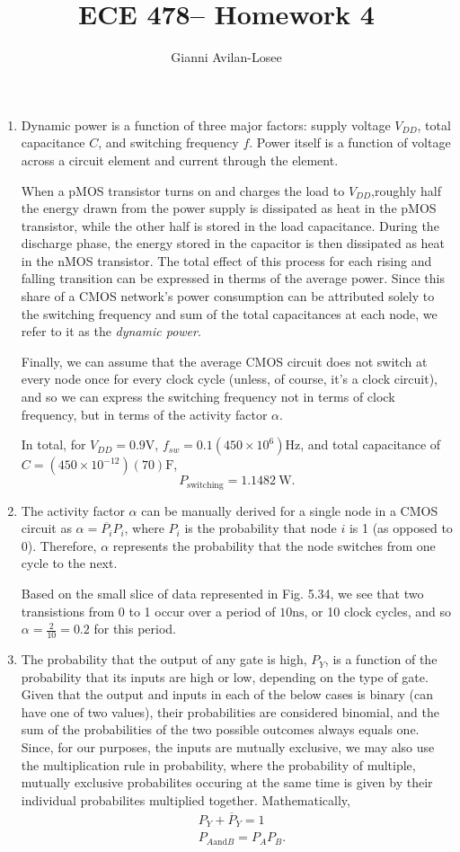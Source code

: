 \documentclass{article}
\title{ECE 478-- Homework 4}
\author{Gianni Avilan-Losee}
\begin{document}
\setcounter{section}{5}
\setcounter{subsection}{1}
\begin{enumerate}[label=\thesubsection]
	\item Dynamic power is a function of three major factors: supply voltage \(V_{DD}\), total capacitance \(C\), and switching frequency \(f\). Power itself is a function of voltage across a circuit element and current through the element.

		When a pMOS transistor turns on and charges the load to \(V_{DD}\),roughly half the energy drawn from the power supply is dissipated as heat in the pMOS transistor, while the other half is stored in the load capacitance. During the discharge phase, the energy stored in the capacitor is then dissipated as heat in the nMOS transistor. The total effect of this process for each rising and falling transition can be expressed in therms of the average power. Since this share of a CMOS network's power consumption can be attributed solely to the switching frequency and sum of the total capacitances at each node, we refer to it as the \textit{dynamic power}. 

		Finally, we can assume that the average CMOS circuit does not switch at every node once for every clock cycle (unless, of course, it's a clock circuit), and so we can express the switching frequency not in terms of clock frequency, but in terms of the activity factor \(\alpha\). 

		In total, for \(V_{DD} = 0.9 \mathrm{V}\), \(f_{sw}=0.1(450 \times 10^6) \mathrm{Hz}\), and total capacitance of \(C=(450 \times 10^{-12})(70)\mathrm{F}\),
		\[
			P_{\mathrm{switching}} = 1.1482 \ \mathrm{W}.
		\]
		\setcounter{subsection}{4}
	\item The activity factor \(\alpha\) can be manually derived for a single node in a CMOS circuit as \(\alpha = \overline{P_i}P_i\), where \(P_i\) is the probability that node \(i\) is 1 (as opposed to 0). Therefore, \(\alpha\) represents the probability that the node switches from one cycle to the next.

		Based on the small slice of data represented in Fig. 5.34, we see that two transistions from 0 to 1 occur over a period of \(10 \mathrm{ns}\), or 10 clock cycles, and so \(\alpha = \frac{2}{10} = 0.2\) for this period.
		\setcounter{subsection}{7}
	\item The probability that the output of any gate is high, \(P_Y\), is a function of the probability that its inputs are high or low, depending on the type of gate. Given that the output and inputs in each of the below cases is binary (can have one of two values), their probabilities are considered binomial, and the sum of the probabilities of the two possible outcomes always equals one. Since, for our purposes, the inputs are mutually exclusive, we may also use the multiplication rule in probability, where the probability of multiple, mutually exclusive probabilites occuring at the same time is given by their individual probabilites multiplied together. Mathematically,
		\begin{align*}
			&P_Y + \overline{P}_Y = 1 \\
			&P_{A \mathrm{and} B} = P_AP_B.
		\end{align*}


\end{enumerate}
\end{document}
